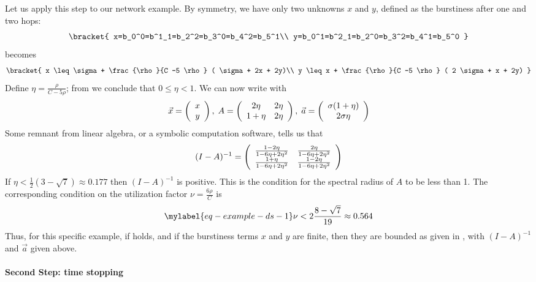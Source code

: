 Let us apply this step to our network example. By symmetry, we
have only two unknowns $x$ and $y$, defined as the burstiness
after one and two hops:
$$\bracket{
x=b_0^0=b^1_1=b_2^2=b_3^0=b_4^2=b_5^1\\
y=b_0^1=b^2_1=b_2^0=b_3^2=b_4^1=b_5^0
 }
$$
 becomes
$$
\bracket{
 x \leq \sigma + \frac{\rho}{C -5 \rho} ( \sigma + 2x + 2y)\\
 y \leq x + \frac{\rho}{C -5 \rho} ( 2 \sigma +  x + 2y)
  }
$$
Define $\eta=\frac{\rho}{C-5 \rho}$; from 
we conclude that $0 \leq \eta <1$. We can now write
 with
$$
 \vec{x}=\left(
  \begin{array}{c}
    x\\y
  \end{array}\right)
  ,\;
 A= \left(\begin{array}{c c}
    2 \eta &  2 \eta\\1 + \eta & 2 \eta
  \end{array}\right)
  ,\;
   \vec{a}=\left(
  \begin{array}{c}
    \sigma (1 + \eta)\\ 2 \sigma \eta
  \end{array}\right)
$$
Some remnant from linear algebra, or a symbolic computation
software, tells us that
$$
(I-A)^{-1}=\left(\begin{array}{c c}
    \frac{1-2  \eta}{1-6  \eta+2
{\eta^2}} & \frac{2  \eta}{1-6  \eta+2  {\eta^2}}  \\
   \frac{1+\eta}{1-6  \eta+2
{\eta^2}}& \frac{1-2  \eta}{1-6  \eta+2  {\eta^2}}
  \end{array}\right)
$$
If $\eta < \frac{1}{2} (3 -\sqrt{7}) \approx 0.177$ then
$(I-A)^{-1}$ is positive. This is the condition for the spectral
radius of $A$ to be less than 1. The corresponding condition on
the utilization factor $\nu= \frac{6\rho}{C}$ is
\begin{equation}\mylabel{eq-example-ds-1}
 \nu <2 \frac{8-\sqrt{7}}{19} \approx 0.564
\end{equation}
Thus, for this specific example, if  holds,
and if the burstiness terms $x$ and $y$ are finite, then they are
bounded as given in , with $(I-A)^{-1}$ and
$\vec{a}$ given above.

\paragraph{Second Step: time stopping}

